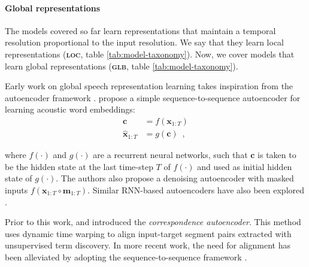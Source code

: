 \paragraph{Global representations}
The models covered so far learn representations that maintain a temporal resolution proportional to the input resolution. We say that they learn local representations (\textbf{\textsc{loc}}, table \ref{tab:model-taxonomy}). Now, we cover models that learn global representations (\textbf{\textsc{glb}}, table \ref{tab:model-taxonomy}).


 
Early work on global speech representation learning takes inspiration from the autoencoder framework \cite{kramer1991nonlinear}. \citet{chung2016audio} propose a simple sequence-to-sequence autoencoder for learning acoustic word embeddings:
%
\begin{align}
    \mathbf{c} &= f(\mathbf{x}_{1:T}) \\
    \hat{\mathbf{x}}_{1:T} &= g(\mathbf{c}) \enspace , \label{eq:dec-aw2v}
\end{align}

\noindent where $f(\cdot)$ and $g(\cdot)$ are a recurrent neural networks, such that $\mathbf{c}$ is taken to be the hidden state at the last time-step $T$ of $f(\cdot)$ and used as initial hidden state of $g(\cdot)$. 
The authors also propose a denoising autoencoder with masked inputs $f(\mathbf{x}_{1:T} \circ \mathbf{m}_{1:T})$. Similar RNN-based autoencoders have also been explored \cite{kamper2019truly, holzenberger2018learning}.
%
%

Prior to this work, \citet{kamper2015unsupervised} and \citet{renshaw2015comparison} introduced the \textit{correspondence autoencoder}. This method uses dynamic time warping to align input-target segment pairs extracted with unsupervised term discovery. In more recent work, the need for alignment has been alleviated by adopting the sequence-to-sequence framework \cite{kamper2019truly, jacobs2021acoustic}.

